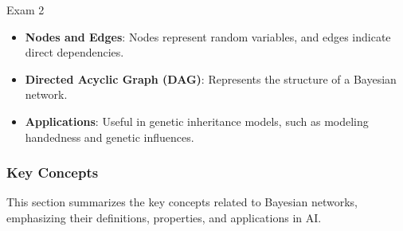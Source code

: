 \begin{examnotes}{Exam 2}
\begin{highlight}
        \begin{itemize}
            \item \textbf{Nodes and Edges}: Nodes represent random variables, and edges indicate direct dependencies.
            \item \textbf{Directed Acyclic Graph (DAG)}: Represents the structure of a Bayesian network.
            \item \textbf{Applications}: Useful in genetic inheritance models, such as modeling handedness and genetic influences.
        \end{itemize}
    \end{highlight}
    
    \subsubsection*{Key Concepts}
    
    \begin{highlight}
        This section summarizes the key concepts related to Bayesian networks, emphasizing their definitions, properties, and applications in AI.
        

\end{highlight}
\end{examnotes}
